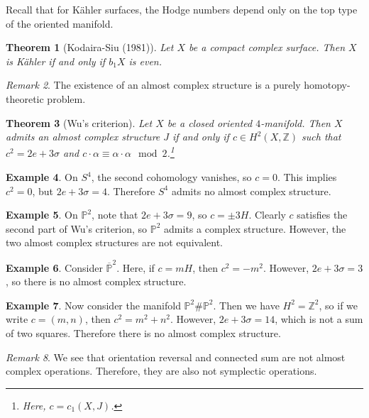 \documentclass[leqno, openany]{memoir}
\newtheorem{thm}{Theorem}[chapter]
\theoremstyle{definition}
\newtheorem{exm}[thm]{Example}
\theoremstyle{remark}
\newtheorem{rmk}[thm]{Remark}
\theoremstyle{plain}
\theoremstyle{definition}
\theoremstyle{remark}
\newcommand{\Z}{\mathbb{Z}}
\renewcommand{\P}{\mathbb{P}}
\begin{document}
Recall that for K\"ahler surfaces, the Hodge numbers depend only on the top
type of the oriented manifold.

\begin{thm}[Kodaira-Siu (1981)] Let $X$ be a compact complex surface. Then $X$
is K\"ahler if and only if $b_1X$ is even.  \end{thm}

\begin{rmk} The existence of an almost complex structure is a purely
homotopy-theoretic problem.  \end{rmk}

\begin{thm}[Wu's criterion] Let $X$ be a closed oriented $4$-manifold. Then $X$
    admits an almost complex structure $J$ if and only if $c \in H^2(X, \Z)$
    such that $c^2 = 2e + 3 \sigma$ and $c \cdot \alpha \equiv \alpha \cdot
    \alpha \mod 2$.\footnote{Here, $c = c_1(X, J)$.} \end{thm}

\begin{exm} On $S^4$, the second cohomology vanishes, so $c = 0$. This implies
$c^2 = 0$, but $2e + 3 \sigma = 4$. Therefore $S^4$ admits no almost complex
structure.  \end{exm}

\begin{exm} On $\P^2$, note that $2e + 3 \sigma = 9$, so $c = \pm 3H$. Clearly
$c$ satisfies the second part of Wu's criterion, so $\P^2$ admits a complex
structure. However, the two almost complex structures are not equivalent.
\end{exm}

\begin{exm} Consider $\overline{\P}^2$. Here, if $c = mH$, then $c^2 = -m^2$.
However, $2e + 3 \sigma = 3$, so there is no almost complex structure.
\end{exm}

\begin{exm} Now consider the manifold $\P^2 \# \P^2$. Then we have $H^2 =
    \Z^2$, so if we write $c = (m,n)$, then $c^2 = m^2 + n^2$. However, $2e + 3
    \sigma = 14$, which is not a sum of two squares. Therefore there is no
    almost complex structure.  \end{exm}

\begin{rmk} We see that orientation reversal and connected sum are not almost
complex operations. Therefore, they are also not symplectic operations.
\end{rmk}
\end{document}
